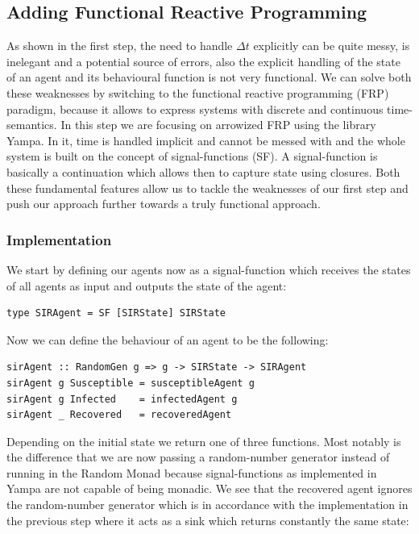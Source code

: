 \subsection{Adding Functional Reactive Programming}
As shown in the first step, the need to handle $\Delta t$ explicitly can be quite messy, is inelegant and a potential source of errors, also the explicit handling of the state of an agent and its behavioural function is not very functional. We can solve both these weaknesses by switching to the functional reactive programming (FRP) paradigm, because it allows to express systems with discrete and continuous time-semantics. In this step we are focusing on arrowized FRP using the library Yampa. In it, time is handled implicit and cannot be messed with and the whole system is built on the concept of signal-functions (SF). A signal-function is basically a continuation which allows then to capture state using closures. Both these fundamental features allow us to tackle the weaknesses of our first step and push our approach further towards a truly functional approach.

\subsubsection{Implementation}
We start by defining our agents now as a signal-function which receives the states of all agents as input and outputs the state of the agent:

\begin{verbatim}
type SIRAgent = SF [SIRState] SIRState 
\end{verbatim}

Now we can define the behaviour of an agent to be the following:

\begin{verbatim}
sirAgent :: RandomGen g => g -> SIRState -> SIRAgent
sirAgent g Susceptible = susceptibleAgent g
sirAgent g Infected    = infectedAgent g
sirAgent _ Recovered   = recoveredAgent
\end{verbatim}

Depending on the initial state we return one of three functions. Most notably is the difference that we are now passing a random-number generator instead of running in the Random Monad because signal-functions as implemented in Yampa are not capable of being monadic. We see that the recovered agent ignores the random-number generator which is in accordance with the implementation in the previous step where it acts as a sink which returns constantly the same state:

